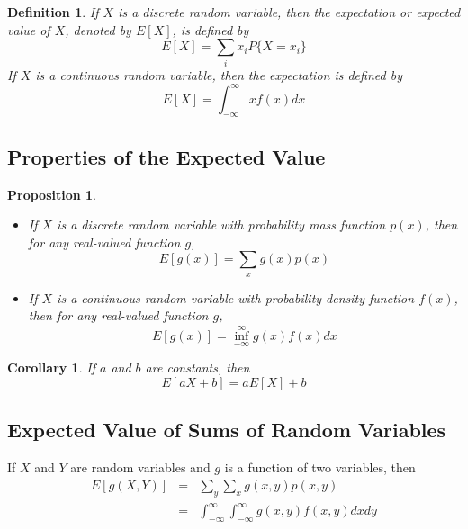 \documentclass[12pt]{article}
\newtheorem{definition}[theorem]{Definition}
\newtheorem{corollary}[theorem]{Corollary}
\newtheorem{proposition}[theorem]{Proposition}
\begin{document}
\begin{definition}
  If $X$ is a discrete random variable, then the expectation or expected value of $X$, denoted by $E[X]$, is defined by
  \begin{equation*}
    E[X] = \sum_i x_i P\{ X = x_i \}
  \end{equation*}
  If $X$ is a continuous random variable, then the expectation is defined by
  \begin{equation*}
    E[X] = \int_{-\infty}^{\infty} x f(x) dx
  \end{equation*}
\end{definition}

\subsection{Properties of the Expected Value}

\begin{proposition}
  \begin{itemize}
    \item If $X$ is a discrete random variable with probability mass function $p(x)$, then for any real-valued function $g$,
      \begin{equation*}
        E[g(x)] = \sum_x g(x)p(x)
      \end{equation*}
    \item If $X$ is a continuous random variable with probability density function $f(x)$, then for any real-valued function $g$,
      \begin{equation*}
        E[g(x)] = \inf_{-\infty}^{\infty} g(x)f(x) dx
      \end{equation*}
  \end{itemize}
\end{proposition}

\begin{corollary}
  If $a$ and $b$ are constants, then
  \begin{equation*}
    E[aX + b] = a E[X] + b
  \end{equation*}
\end{corollary}

\subsection{Expected Value of Sums of Random Variables}

If $X$ and $Y$ are random variables and $g$ is a function of two variables, then
\begin{eqnarray*}
  E[g(X,Y)]
  &=& \sum_y \sum_x g(x,y) p(x,y) \\
  &=& \int_{-\infty}^{\infty} \int_{-\infty}^{\infty} g(x,y) f(x,y) dx dy
\end{eqnarray*}
\end{document}
